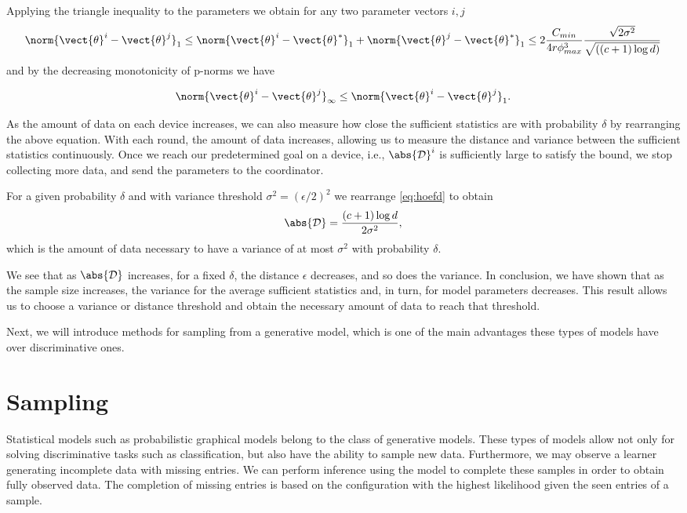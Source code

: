 Applying the triangle inequality to the parameters we obtain for any two parameter vectors $i,j$
\begin{equation}
    \norm{\vect{\theta}^i- \vect{\theta}^j}_1 \leq  \norm{\vect{\theta}^i - \vect{\theta}^*}_1  +  \norm{\vect{\theta}^j- \vect{\theta}^*}_1 \leq 2 \frac{C_{min}}{4r\phi^3_{max}} \frac{\sqrt{2\sigma^2}}{\sqrt{((c+1) \log d)}}
\end{equation}
and by the decreasing monotonicity of p-norms \cite{raissouli2010various} we have

\begin{equation}
    \norm{\vect{\theta}^i- \vect{\theta}^j}_{\infty}  \leq \norm{\vect{\theta}^i- \vect{\theta}^j}_1.
\end{equation}

As the amount of data on each device increases, we can also measure how close the sufficient statistics are with probability $\delta$ by rearranging the above equation. 
With each round, the amount of data increases, allowing us to measure the distance and variance between the sufficient statistics continuously.
Once we reach our predetermined goal on a device, i.e., $\abs{\mathcal{D}}^i$ is sufficiently large to satisfy the bound, we stop collecting more data, and send the parameters to the coordinator.

For a given probability $\delta$ and with variance threshold $\sigma^2 = (\epsilon/2)^2$ we rearrange \autoref{eq:hoefd} to obtain 
\begin{equation}
    \abs{\mathcal{D}} = \frac{(c+1) \log d}{2 \sigma^2},
\end{equation} 
which is the amount of data necessary to have a variance of at most $\sigma^2$ with probability $\delta$.

We see that as $\abs{\mathcal{D}}$ increases, for a fixed $\delta$, the distance $\epsilon$ decreases, and so does the variance. 
In conclusion, we have shown that as the sample size increases, the variance for the average sufficient statistics and, in turn, for model parameters decreases.
This result allows us to choose a variance or distance threshold and obtain the necessary amount of data to reach that threshold.

Next, we will introduce methods for sampling from a generative model, which is one of the main advantages these types of models have over discriminative ones.

\section{Sampling}
\label{sec:sampling}
Statistical models such as probabilistic graphical models belong to the class of generative models.
These types of models allow not only for solving discriminative tasks such as classification, but also have the ability to sample new data.
Furthermore, we may observe a learner generating incomplete data with missing entries.
We can perform inference using the model to complete these samples in order to obtain fully observed data.
The completion of missing entries is based on the configuration with the highest likelihood given the seen entries of a sample.

